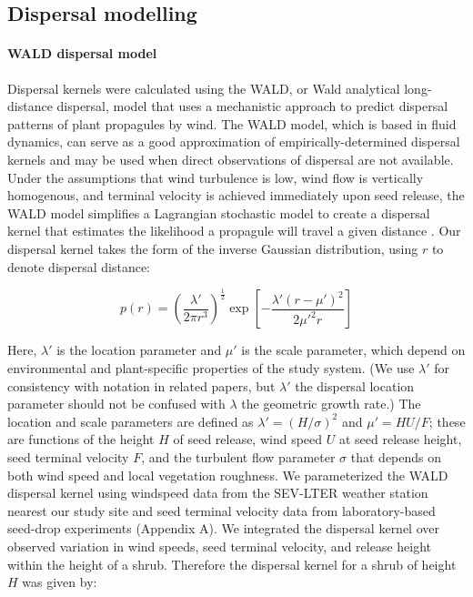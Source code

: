 \documentclass[11pt]{article}\usepackage[]{graphicx}\usepackage[]{color}
\begin{document}
\subsection*{Dispersal modelling}
\paragraph{WALD dispersal model}
Dispersal kernels were calculated using the WALD, or Wald analytical long-distance dispersal, model that uses a mechanistic approach to predict dispersal patterns of plant propagules by wind.
The WALD model, which is based in fluid dynamics, can serve as a good approximation of empirically-determined dispersal kernels \citep{katul2005mechanistic, skarpaas2007dispersal} and may be used when direct observations of dispersal are not available. 
Under the assumptions that wind turbulence is low, wind flow is vertically homogenous, and terminal velocity is achieved immediately upon seed release, the WALD model simplifies a Lagrangian stochastic model to create a dispersal kernel that estimates the likelihood a propagule will travel a given distance \citep{katul2005mechanistic}.
Our dispersal kernel takes the form of the inverse Gaussian distribution, using $r$ to denote dispersal distance:

\begin{linenomath*} \begin{equation} p(r) = \left(\frac{\lambda'}{2 \pi r^3}\right)^\frac{1}{2} \exp\left[-\frac{\lambda'(r - \mu')^2}{2 \mu'^2 r}\right] \end{equation} \end{linenomath*} 

Here, $\lambda'$ is the location parameter and $\mu'$ is the scale parameter, which depend on environmental and plant-specific properties of the study system. 
(We use $\lambda'$ for consistency with notation in related papers, but $\lambda'$ the dispersal location parameter should not be confused with $\lambda$ the geometric growth rate.)
The location and scale parameters are defined as $\lambda' = (H/\sigma)^2$ and $\mu' = HU/F$; these are functions of the height $H$ of seed release, wind speed $U$ at seed release height, seed terminal velocity $F$, and the turbulent flow parameter $\sigma$ that depends on both wind speed and local vegetation roughness. 
We parameterized the WALD dispersal kernel using windspeed data from the SEV-LTER weather station nearest our study site \citep{SEVmet} and seed terminal velocity data from laboratory-based seed-drop experiments (Appendix A). 
We integrated the dispersal kernel over observed variation in wind speeds, seed terminal velocity, and release height within the height of a shrub.
Therefore the dispersal kernel for a shrub of height $H$ was given by:
\end{document}
